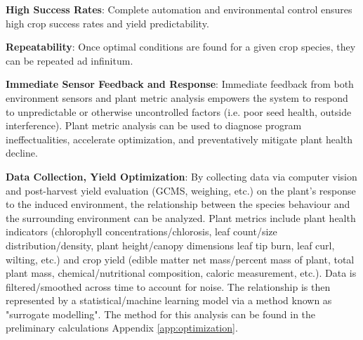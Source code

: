 \textbf{High Success Rates}: Complete automation and environmental control ensures high crop success rates and yield predictability.

\textbf{Repeatability}: Once optimal conditions are found for a given crop species, they can be repeated ad infinitum.

\textbf{Immediate Sensor Feedback and Response}: Immediate feedback from both environment sensors and plant metric analysis empowers the system to respond to unpredictable or otherwise uncontrolled factors (i.e. poor seed health, outside interference). Plant metric analysis can be used to diagnose program ineffectualities, accelerate optimization, and preventatively mitigate plant health decline.

\textbf{Data Collection, Yield Optimization}: By collecting data via computer vision and post-harvest yield evaluation (GCMS, weighing, etc.) on the plant's response to the induced environment, the relationship between the species behaviour and the surrounding environment can be analyzed. Plant metrics include plant health indicators (chlorophyll concentrations/chlorosis, leaf count/size distribution/density, plant height/canopy dimensions leaf tip burn, leaf curl, wilting, etc.) and crop yield (edible matter net mass/percent mass of plant, total plant mass, chemical/nutritional composition, caloric measurement, etc.). Data is filtered/smoothed across time to account for noise. The relationship is then represented by a statistical/machine learning model via a method known as "surrogate modelling". The method for this analysis can be found in the preliminary calculations Appendix \ref{app:optimization}.